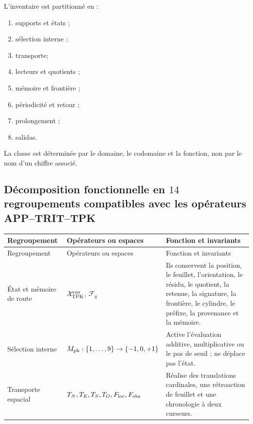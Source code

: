 {L’inventaire est partitionné en :
\begin{enumerate}
 \item[\textbf{C1.}] supports et états ;
 \item[\textbf{C2.}] sélection interne ;
 \item[\textbf{C3.}] transporte;
 \item[\textbf{C4.}] lecteurs et quotients ;
 \item[\textbf{C5.}] mémoire et frontière ;
 \item[\textbf{C6.}] périodicité et retour ;
 \item[\textbf{C7.}] prolongement ;
 \item[\textbf{C8.}] salidas.
\end{enumerate}
La classe est déterminée par le domaine, le codomaine et la fonction, non par le nom
d’un chiffre associé.

\Needspace{.92\textheight}
\subsection{Décomposition fonctionnelle en \(14\) regroupements compatibles avec les opérateurs APP–TRIT–TPK}

\begingroup
\small
\renewcommand{\arraystretch}{1.12}
\begin{longtable}{@{}>{\raggedright\arraybackslash}p{}>{\raggedright\arraybackslash}p{}>{\raggedright\arraybackslash}p{}@{}}
\toprule
Regroupement&Opérateurs ou espaces&Fonction et invariants\\
\midrule
\endfirsthead
\toprule
Regroupement&Opérateurs ou espaces&Fonction et invariants\\
\midrule
\endhead
État et mémoire de route&
\(\mathcal X_{\rm TPK}^{\rm enr}\), \(\mathcal F_q\)&
Ils conservent la position, le feuillet, l’orientation, le résidu, le quotient, la retenue, la signature,
la frontière, le cylindre, le préfixe, la provenance et la mémoire.\\

Sélection interne&
\(M_{\rm ph}:\{1,\ldots,9\}\to\{-1,0,+1\}\)&
Active l’évaluation additive, multiplicative ou le pas de seuil ; ne déplace pas
l’état.\\

Transporte espacial&
\(T_N,T_E,T_S,T_O,F_{\rm loc},F_{\rm obs}\)&
Réalise des translations cardinales, une rétroaction de feuillet et une chronologie à deux
curseurs.\\


\end{longtable}}
